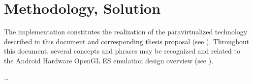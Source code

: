 
\chapter{Methodology, Solution}
\label{cha:methodologysolution}
The implementation constitutes the realization of the paravirtualized technology described in this document and corresponding thesis proposal (see ).
Throughout this document, several concepts and phrases may be recognized and related to the Android Hardware OpenGL ES emulation design overview (see ).

\ldots

